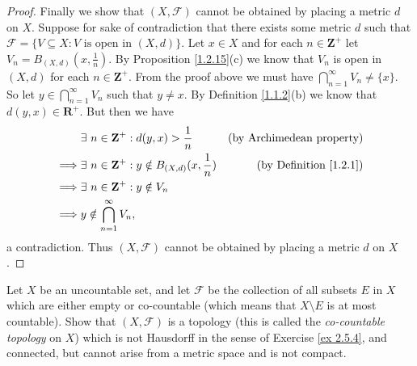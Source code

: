 \begin{proof}
    Finally we show that \((X, \mathcal{F})\) cannot be obtained by placing a metric \(d\) on \(X\).
    Suppose for sake of contradiction that there exists some metric \(d\) such that \(\mathcal{F} = \{V \subseteq X : V \text{ is open in } (X, d)\}\).
    Let \(x \in X\) and for each \(n \in \mathbf{Z}^+\) let \(V_n = B_{(X, d)}(x, \frac{1}{n})\).
    By Proposition \ref{1.2.15}(c) we know that \(V_n\) is open in \((X, d)\) for each \(n \in \mathbf{Z}^+\).
    From the proof above we must have \(\bigcap_{n = 1}^\infty V_n \neq \{x\}\).
    So let \(y \in \bigcap_{n = 1}^\infty V_n\) such that \(y \neq x\).
    By Definition \ref{1.1.2}(b) we know that \(d(y, x) \in \mathbf{R}^+\).
    But then we have
    \begin{align*}
                 & \exists\ n \in \mathbf{Z}^+ : d(y, x) > \frac{1}{n}               & \text{(by Archimedean property)}   \\
        \implies & \exists\ n \in \mathbf{Z}^+ : y \notin B_{(X, d)}(x, \frac{1}{n}) & \text{(by Definition \ref{1.2.1})} \\
        \implies & \exists\ n \in \mathbf{Z}^+ : y \notin V_n                                                             \\
        \implies & y \notin \bigcap_{n = 1}^\infty V_n,
    \end{align*}
    a contradiction.
    Thus \((X, \mathcal{F})\) cannot be obtained by placing a metric \(d\) on \(X\).
\end{proof}

\begin{exercise}\label{ex 2.5.7}
    Let \(X\) be an uncountable set, and let \(\mathcal{F}\) be the collection of all subsets \(E\) in \(X\) which are either empty or co-countable
    (which means that \(X \setminus E\) is at most countable).
    Show that \((X, \mathcal{F})\) is a topology (this is called the \emph{co-countable topology} on \(X\)) which is not Hausdorff in the sense of Exercise \ref{ex 2.5.4}, and connected, but cannot arise from a metric space and is not compact.
\end{exercise}

